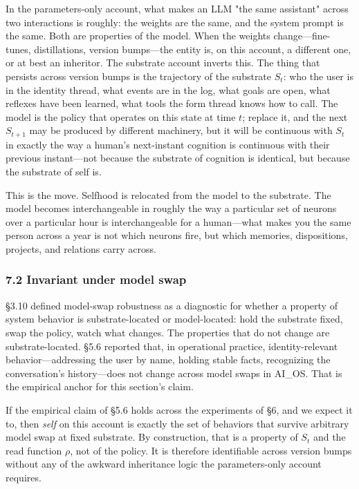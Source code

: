 \documentclass[11pt,letterpaper]{article}
\begin{document}
In the parameters-only account, what makes an LLM "the same assistant" across two interactions is roughly: the weights are the same, and the system prompt is the same. Both are properties of the model. When the weights change---fine-tunes, distillations, version bumps---the entity is, on this account, a different one, or at best an inheritor. The substrate account inverts this. The thing that persists across version bumps is the trajectory of the substrate $S_t$: who the user is in the identity thread, what events are in the log, what goals are open, what reflexes have been learned, what tools the form thread knows how to call. The model is the policy that operates on this state at time $t$; replace it, and the next $S_{t+1}$ may be produced by different machinery, but it will be continuous with $S_t$ in exactly the way a human's next-instant cognition is continuous with their previous instant---not because the substrate of cognition is identical, but because the substrate of self is.

This is the move. Selfhood is relocated from the model to the substrate. The model becomes interchangeable in roughly the way a particular set of neurons over a particular hour is interchangeable for a human---what makes you the same person across a year is not which neurons fire, but which memories, dispositions, projects, and relations carry across.

\subsubsection*{7.2 Invariant under model swap}

§3.10 defined model-swap robustness as a diagnostic for whether a property of system behavior is substrate-located or model-located: hold the substrate fixed, swap the policy, watch what changes. The properties that do not change are substrate-located. §5.6 reported that, in operational practice, identity-relevant behavior---addressing the user by name, holding stable facts, recognizing the conversation's history---does not change across model swaps in AI\_OS. That is the empirical anchor for this section's claim.

If the empirical claim of §5.6 holds across the experiments of §6, and we expect it to, then \emph{self} on this account is exactly the set of behaviors that survive arbitrary model swap at fixed substrate. By construction, that is a property of $S_t$ and the read function $\rho$, not of the policy. It is therefore identifiable across version bumps without any of the awkward inheritance logic the parameters-only account requires.
\end{document}

